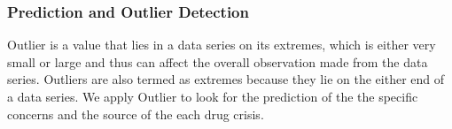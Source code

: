 \documentclass{mcmthesis}
\begin{document}




\subsubsection{Prediction and Outlier Detection}

Outlier is a value that lies in a data series on its extremes, which is either very small or large and thus can affect the overall observation made from the data series. Outliers are also termed as extremes because they lie on the either end of a data series. We apply Outlier to look for the prediction of the the specific concerns and the source of the each drug crisis.  
\end{document}
